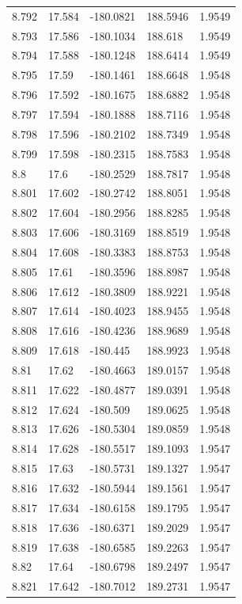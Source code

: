 \begin{tabular}{lllll}
8.792 & 17.584 & -180.0821 & 188.5946 & 1.9549 \\
8.793 & 17.586 & -180.1034 & 188.618 & 1.9549 \\
8.794 & 17.588 & -180.1248 & 188.6414 & 1.9549 \\
8.795 & 17.59 & -180.1461 & 188.6648 & 1.9548 \\
8.796 & 17.592 & -180.1675 & 188.6882 & 1.9548 \\
8.797 & 17.594 & -180.1888 & 188.7116 & 1.9548 \\
8.798 & 17.596 & -180.2102 & 188.7349 & 1.9548 \\
8.799 & 17.598 & -180.2315 & 188.7583 & 1.9548 \\
8.8 & 17.6 & -180.2529 & 188.7817 & 1.9548 \\
8.801 & 17.602 & -180.2742 & 188.8051 & 1.9548 \\
8.802 & 17.604 & -180.2956 & 188.8285 & 1.9548 \\
8.803 & 17.606 & -180.3169 & 188.8519 & 1.9548 \\
8.804 & 17.608 & -180.3383 & 188.8753 & 1.9548 \\
8.805 & 17.61 & -180.3596 & 188.8987 & 1.9548 \\
8.806 & 17.612 & -180.3809 & 188.9221 & 1.9548 \\
8.807 & 17.614 & -180.4023 & 188.9455 & 1.9548 \\
8.808 & 17.616 & -180.4236 & 188.9689 & 1.9548 \\
8.809 & 17.618 & -180.445 & 188.9923 & 1.9548 \\
8.81 & 17.62 & -180.4663 & 189.0157 & 1.9548 \\
8.811 & 17.622 & -180.4877 & 189.0391 & 1.9548 \\
8.812 & 17.624 & -180.509 & 189.0625 & 1.9548 \\
8.813 & 17.626 & -180.5304 & 189.0859 & 1.9548 \\
8.814 & 17.628 & -180.5517 & 189.1093 & 1.9547 \\
8.815 & 17.63 & -180.5731 & 189.1327 & 1.9547 \\
8.816 & 17.632 & -180.5944 & 189.1561 & 1.9547 \\
8.817 & 17.634 & -180.6158 & 189.1795 & 1.9547 \\
8.818 & 17.636 & -180.6371 & 189.2029 & 1.9547 \\
8.819 & 17.638 & -180.6585 & 189.2263 & 1.9547 \\
8.82 & 17.64 & -180.6798 & 189.2497 & 1.9547 \\
8.821 & 17.642 & -180.7012 & 189.2731 & 1.9547 \\

\end{tabular}
